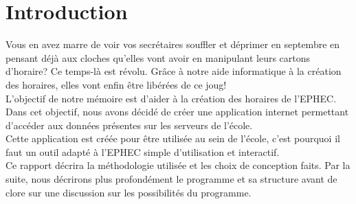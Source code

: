 

\chapter*{Introduction}

Vous en avez marre de voir vos secrétaires souffler et déprimer en septembre en pensant déjà aux cloches qu'elles vont avoir en manipulant leurs cartons d'horaire? 
Ce temps-là est révolu. Grâce à notre aide informatique à la création des horaires, elles vont enfin être libérées de ce joug!\\
\newline
\indent
L'objectif de notre mémoire est d'aider à la création des horaires de l'EPHEC.
Dans cet objectif, nous avons décidé de créer une application internet permettant d'accéder
aux données présentes sur les serveurs de l'école.\\
\newline
\indent
Cette application est créée pour être utilisée au sein de l'école, c'est pourquoi il faut un 
outil adapté à l'EPHEC simple d'utilisation et interactif. \\
\newline
\indent
Ce rapport décrira la méthodologie utilisée et les choix de conception faits.
Par la suite, nous décrirons plus profondément le programme et sa structure avant de clore sur une discussion sur les possibilités du programme. 



